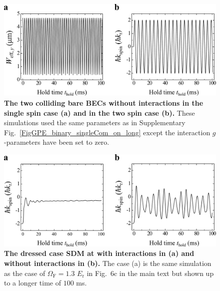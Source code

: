 \documentclass[showpacs,preprintnumbers,amsmath,amssymb, superscriptaddress, aps, reprint]{revtex4-1}
\def\E_r{E_{\text{r}}}
\def\OmegaF{\Omega_{\text{F}}}
\begin{document}
{{\begin{figure}[H]
\centering
\includegraphics[width=5.0in]{SI_Fig7_binary_singleCom_off_long_Vfinal.pdf}
\caption{\textbf{The two colliding bare BECs without interactions in the single spin case (a) and in the two spin case (b).} These simulations used the same parameters as in Supplementary Fig.~\ref{FigGPE_binary_singleCom_on_long} except the interaction $g$-parameters have been set to zero.}
\label{FigGPE_binary_singleCom_on_off_long}
\end{figure}

\begin{figure}[H]
\centering
\includegraphics[width=5.0in]{SI_Fig8_OF13_on_off_long_Vfinal.pdf}
\caption{\textbf{The dressed case SDM at \boldmath{$\OmegaF=1.3 \E_r$} with interactions in (a) and without interactions in (b).} The case (a) is the same simulation as the case of $\OmegaF=1.3$ $\E_r$ in {Fig.~6c in the main text} but shown up to a longer time of $100$ ms.}
\label{FigGPE_OF13_on_off_long}
\end{figure}

}}
\end{document}
